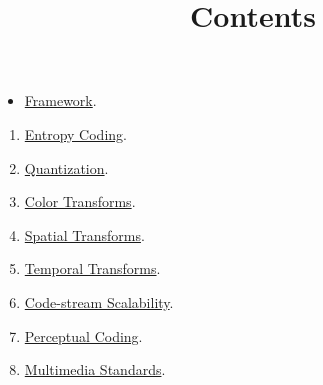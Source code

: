 

\title{\SM{} \newline Contents}

\maketitle

\begin{itemize}
  \item \href{https://sistemas-multimedia.github.io/contents/provisioning}{Framework}. %
\end{itemize}
\begin{enumerate}
\item \href{https://sistemas-multimedia.github.io/contents/entropy_coding}{Entropy Coding}.  %
\item \href{https://sistemas-multimedia.github.io/contents/quantization}{Quantization}.  %
\item \href{https://sistemas-multimedia.github.io/contents/color_transforms}{Color Transforms}.  %
\item \href{https://sistemas-multimedia.github.io/contents/spatial_transforms}{Spatial Transforms}.  %
\item \href{https://sistemas-multimedia.github.io/contents/temporal_transforms}{Temporal Transforms}.  %
\item \href{https://sistemas-multimedia.github.io/contents/data_scalability}{Code-stream Scalability}.  %
\item \href{https://sistemas-multimedia.github.io/contents/perceptual_coding}{Perceptual Coding}.  %
\item \href{https://sistemas-multimedia.github.io/contents/standards}{Multimedia Standards}.  %
\end{enumerate}

